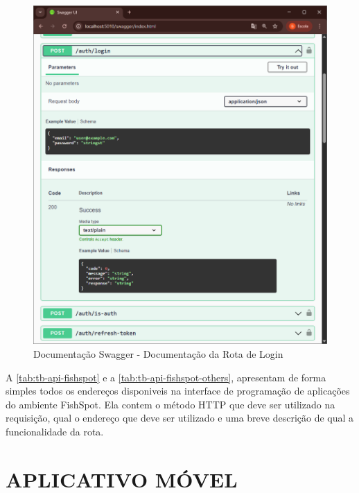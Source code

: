 \begin{figure}[H]
    \centering
    \caption{Documentação Swagger - Documentação da Rota de Login}
    \label{fig:docSwaggerLoginAPI}
    \includegraphics[scale=0.60]{./dados/figuras/swagger-api-login-doc.png}
\end{figure}


\newpage

A \autoref{tab:tb-api-fishspot} e a \autoref{tab:tb-api-fishspot-others},  apresentam de forma simples todos os endereços disponiveis na interface de programação de aplicações do ambiente FishSpot. Ela contem o método HTTP que deve ser utilizado na requisição, qual o endereço que deve ser utilizado e uma breve descrição de qual a funcionalidade da rota.





\newpage

\section{APLICATIVO MÓVEL}
\label{sec:desenvolvimentodoapp}

